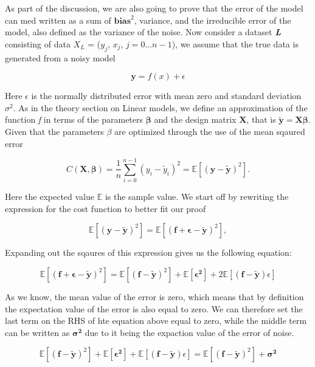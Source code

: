 \documentclass[a4paper, 10pt]{article}
\begin{document}
As part of the discussion, we are also going to prove that the error of the model can med written as a sum of $\boldsymbol{bias}^2$, variance, and the irreducible error of the model, also defined as the variance of the noise. Now consider a dataset \textbf{\emph{L}} consisting of data \textbf{\emph{$X_L$}} = {(\emph{$y_j$}, \textbf{$x_j$}, $j=0 ... n-1$)}, we assume that the true data is generated from a noisy model 

$$
\boldsymbol{y} = f(x) + \epsilon
$$

Here $\epsilon$ is the normally distributed error with mean zero and standard deviation $\sigma^2$. As in the theory section on Linear models, we define an approximation of the function \emph{f} in terms of the parameters $\boldsymbol{\beta}$ and the design matrix $\boldsymbol{X}$, that is $\boldsymbol{\tilde{y}} = \boldsymbol{X}\boldsymbol{\beta}$. Given that the parameters $\beta$ are optimized through the use of the mean sqaured error 

$$
C(\boldsymbol{X},\boldsymbol{\beta}) =\frac{1}{n}\sum_{i=0}^{n-1}(y_i-\tilde{y}_i)^2=\mathbb{E}\left[(\boldsymbol{y}-\boldsymbol{\tilde{y}})^2\right].
$$

Here the expected value $\mathbb{E}$ is the sample value. We start off by rewriting the expression for the cost function to better fit our proof

$$
\mathbb{E}\left[(\boldsymbol{y}-\boldsymbol{\tilde{y}})^2\right]=\mathbb{E}\left[(\boldsymbol{f}+\boldsymbol{\epsilon}-\boldsymbol{\tilde{y}})^2\right],
$$

Expanding out the sqaures of this expression gives us the following equation: 

$$
\mathbb{E}\left[(\boldsymbol{f}+\boldsymbol{\epsilon}-\boldsymbol{\tilde{y}})^2\right] = \mathbb{E}\left[(\boldsymbol{f}-\boldsymbol{\tilde{y}})^2\right] + \mathbb{E}[\boldsymbol{\epsilon^2}] + 2\mathbb{E}[(\boldsymbol{f} - \boldsymbol{\tilde{y}}) \epsilon]  
$$

As we know, the mean value of the error is zero, which means that by definition the expectation value of the error is also equal to zero. We can therefore set the last term on the RHS of hte equation above equal to zero, while the middle term can be written as $\boldsymbol{\sigma^2}$ due to it being the expaction value of the error of noise. 

$$
\mathbb{E}\left[(\boldsymbol{f}-\boldsymbol{\tilde{y}})^2\right] + \mathbb{E}[\boldsymbol{\epsilon^2}] + \mathbb{E}[(\boldsymbol{f} - \boldsymbol{\tilde{y}}) \epsilon] = \mathbb{E}\left[(\boldsymbol{f}-\boldsymbol{\tilde{y}})^2\right] + \boldsymbol{\sigma^2} 
$$
\end{document}
